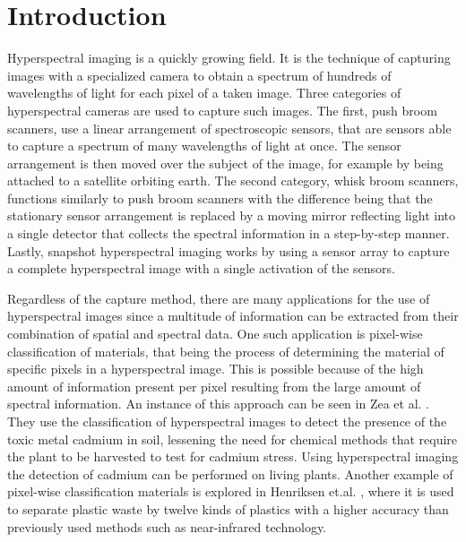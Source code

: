 \chapter{Introduction\label{cha:chapter1}}
Hyperspectral imaging is a quickly growing field. It is the technique of capturing images with a specialized camera to obtain a spectrum of hundreds of wavelengths of light for each pixel of a taken image. Three categories of hyperspectral cameras are used to capture such images. The first, push broom scanners, use a linear arrangement of spectroscopic sensors, that are sensors able to capture a spectrum of many wavelengths of light at once. The sensor arrangement is then moved over the subject of the image, for example by being attached to a satellite orbiting earth. The second category, whisk broom scanners, functions similarly to push broom scanners with the difference being that the stationary sensor arrangement is replaced by a moving mirror reflecting light into a single detector that collects the spectral information in a step-by-step manner. Lastly, snapshot hyperspectral imaging works by using a sensor array to capture a complete hyperspectral image with a single activation of the sensors. 

Regardless of the capture method, there are many applications for the use of hyperspectral images since a multitude of information can be extracted from their combination of spatial and spectral data. One such application is pixel-wise classification of materials, that being the process of determining the material of specific pixels in a hyperspectral image. This is possible because of the high amount of information present per pixel resulting from the large amount of spectral information. An instance of this approach can be seen in Zea et al. \citep{zea_leveraging_2022}. They use the classification of hyperspectral images to detect the presence of the toxic metal cadmium in soil, lessening the need for chemical methods that require the plant to be harvested to test for cadmium stress. Using hyperspectral imaging the detection of cadmium can be performed on living plants. Another example of pixel-wise classification materials is explored in Henriksen et.al. \citep{henriksen_plastic_2022}, where it is used to separate plastic waste by twelve kinds of plastics with a higher accuracy than previously used methods such as near-infrared technology.

